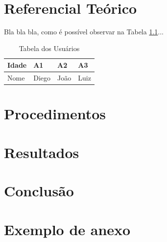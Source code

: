 \documentclass[12pt,brazilian,twoside]{abntex2}
\begin{document}
\chapter{Referencial Teórico}
 
 Bla bla bla, como é possível observar na Tabela \ref{usuarios}...
\begin{table}[h]
\center
\caption{Tabela dos Usuários}
\begin{tabular}{|l|l|l|l|}
\hline
Idade & A1    & A2   & A3   \\ \hline
Nome  & Diego & João & Luiz \\ \hline
\end{tabular}
\label{usuarios}
\end{table}

\chapter{Procedimentos}

\chapter{Resultados}

\chapter{Conclusão}

\postextual



\anexos
\chapter{Exemplo de anexo}
\end{document}
